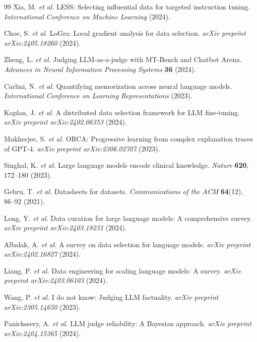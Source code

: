 \documentclass[11pt,twocolumn]{article}
\begin{document}
\begin{thebibliography}{99}
Xia, M. \textit{et al.} LESS: Selecting influential data for targeted instruction tuning. \textit{International Conference on Machine Learning} (2024).

Choe, S. \textit{et al.} LoGra: Local gradient analysis for data selection. \textit{arXiv preprint arXiv:2405.18260} (2024).

Zheng, L. \textit{et al.} Judging LLM-as-a-judge with MT-Bench and Chatbot Arena. \textit{Advances in Neural Information Processing Systems} \textbf{36} (2024).

Carlini, N. \textit{et al.} Quantifying memorization across neural language models. \textit{International Conference on Learning Representations} (2023).

Kaplan, J. \textit{et al.} A distributed data selection framework for LLM fine-tuning. \textit{arXiv preprint arXiv:2402.06353} (2024).

Mukherjee, S. \textit{et al.} ORCA: Progressive learning from complex explanation traces of GPT-4. \textit{arXiv preprint arXiv:2306.02707} (2023).

Singhal, K. \textit{et al.} Large language models encode clinical knowledge. \textit{Nature} \textbf{620}, 172--180 (2023).

Gebru, T. \textit{et al.} Datasheets for datasets. \textit{Communications of the ACM} \textbf{64}(12), 86--92 (2021).

Long, Y. \textit{et al.} Data curation for large language models: A comprehensive survey. \textit{arXiv preprint arXiv:2403.18231} (2024).

Albalak, A. \textit{et al.} A survey on data selection for language models. \textit{arXiv preprint arXiv:2402.16827} (2024).

Liang, P. \textit{et al.} Data engineering for scaling language models: A survey. \textit{arXiv preprint arXiv:2403.06103} (2024).

Wang, P. \textit{et al.} I do not know: Judging LLM factuality. \textit{arXiv preprint arXiv:2305.14650} (2023).

Panickssery, A. \textit{et al.} LLM judge reliability: A Bayesian approach. \textit{arXiv preprint arXiv:2404.15365} (2024).


\end{thebibliography}
\end{document}
